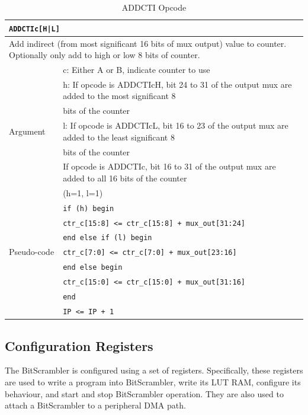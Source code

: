 \documentclass[main\_\_EN.tex]{subfiles}
\begin{document}
\begin{table}[H]
\caption{ADDCTI Opcode}
\label{tab:bitscrm-addcti-opcode}
\begin{tabular}{|l|l|}
\hline
\multicolumn{2}{|l|}{\texttt{ADDCTIc[H|L]}} \\
\hline
\multicolumn{2}{|L{17cm}|}{Add indirect (from most significant 16 bits of mux output) value to counter. Optionally only add to high or low 8 bits of counter.} \\
\hline
\multirow{7}{*}{Argument} & c: Either A or B, indicate counter to use \\
& h: If opcode is ADDCTIcH, bit 24 to 31 of the output mux are added to the most significant 8 \\
& bits of the counter \\
& l: If opcode is ADDCTIcL, bit 16 to 23 of the output mux are added to the least significant 8 \\
& bits of the counter \\
& If opcode is ADDCTIc, bit 16 to 31 of the output mux are added to all 16 bits of the counter \\
& (h=1, l=1) \\
\hline
\multirow{7}{*}{Pseudo-code} & \texttt{if (h) begin} \\
& \hspace*{4mm} \texttt{ctr\_c[15:8] <= ctr\_c[15:8] + mux\_out[31:24]} \\
& \texttt{end else if (l) begin} \\
& \hspace*{4mm} \texttt{ctr\_c[7:0] <= ctr\_c[7:0] + mux\_out[23:16]} \\
& \texttt{end else begin} \\
& \hspace*{4mm} \texttt{ctr\_c[15:0] <= ctr\_c[15:0] + mux\_out[31:16]} \\
& \texttt{end} \\
& \texttt{IP <= IP + 1} \\
\hline
\end{tabular}
\end{table}

\subsection{Configuration Registers}

The BitScrambler is configured using a set of registers. Specifically, these registers are used to write a program into BitScrambler, write its LUT RAM, configure its behaviour, and start and stop BitScrambler operation. They are also used to attach a BitScrambler to a peripheral DMA path.
\end{document}
